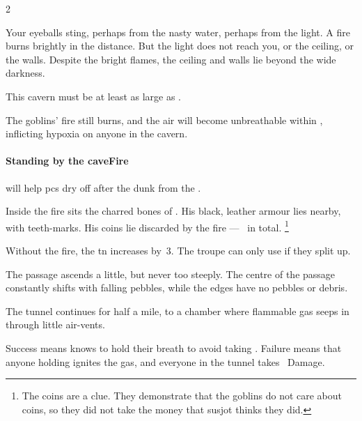 \begin{multicols}{2}

\begin{boxtext}[]
  Your eyeballs sting, perhaps from the nasty water, perhaps from the light.
  A fire burns brightly in the distance.
  But the light does not reach you, or the ceiling, or the walls.
  Despite the bright flames, the ceiling and walls lie beyond the wide darkness.

  \smallbreak
  This cavern must be at least as large as .
\end{boxtext}

The goblins' fire still burns, and the air will become unbreathable within , inflicting \gls{hypoxia} on anyone in the cavern.

\paragraph{Standing by the \gls{caveFire}}
will help \glspl{pc} dry off after the dunk from the .

Inside the fire sits the charred bones of .
His black, leather armour lies nearby, with teeth-marks.
His coins lie discarded by the fire --- \lootSmall\ in total.%
\footnote{\label{caveCoinsII}The coins are a clue.  They demonstrate that the goblins do not care about coins, so they did not take the money that \gls{susjot} thinks they did.}

\setcounter{diceNo}{0}%
\renewcommand\npcsymbol{\currency}

Without the fire, the \gls{tn} increases by~3.
The troupe can only use  if they split up.

\bigskip




\begin{boxtext}[]
  The passage ascends a little, but never too steeply.
  The centre of the passage constantly shifts with falling pebbles, while the edges have no pebbles or debris.
\end{boxtext}

The tunnel continues for half a mile, to a chamber where flammable gas seeps in through little air-vents.

Success means  knows to hold their breath to avoid taking .
Failure means that anyone holding  ignites the gas, and everyone in the tunnel takes ~Damage.


\end{multicols}
